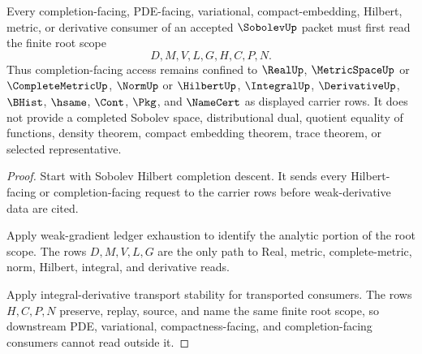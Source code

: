 \begin{theorem}
\label{thm:sobolev-completion-facing-root-scope}
Every completion-facing, PDE-facing, variational, compact-embedding, Hilbert, metric, or derivative consumer of an accepted $\SobolevUp$ packet must first read the finite root scope
$$
D,M,V,L,G,H,C,P,N .
$$
Thus completion-facing access remains confined to $\RealUp$, $\MetricSpaceUp$ or $\CompleteMetricUp$, $\NormUp$ or $\HilbertUp$, $\IntegralUp$, $\DerivativeUp$, $\BHist$, $\hsame$, $\Cont$, $\Pkg$, and $\NameCert$ as displayed carrier rows. It does not provide a completed Sobolev space, distributional dual, quotient equality of functions, density theorem, compact embedding theorem, trace theorem, or selected representative.
\end{theorem}
\begin{proof}
Start with Sobolev Hilbert completion descent. It sends every Hilbert-facing or completion-facing request to the carrier rows before weak-derivative data are cited.

Apply weak-gradient ledger exhaustion to identify the analytic portion of the root scope. The rows $D,M,V,L,G$ are the only path to Real, metric, complete-metric, norm, Hilbert, integral, and derivative reads.

Apply integral-derivative transport stability for transported consumers. The rows $H,C,P,N$ preserve, replay, source, and name the same finite root scope, so downstream PDE, variational, compactness-facing, and completion-facing consumers cannot read outside it.
\end{proof}

